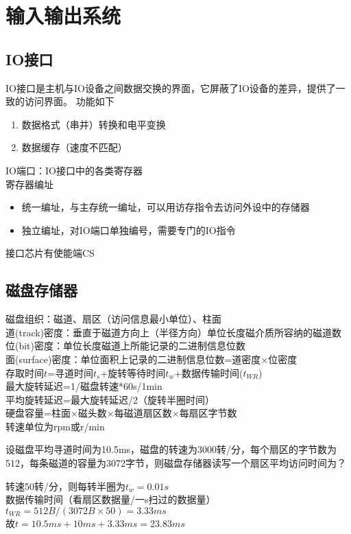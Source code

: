 
\section{输入输出系统}
\subsection{IO接口}
IO接口是主机与IO设备之间数据交换的界面，它屏蔽了IO设备的差异，提供了一致的访问界面。
功能如下
\begin{enumerate}
	\item 数据格式（串并）转换和电平变换
	\item 数据缓存（速度不匹配）
\end{enumerate}
IO端口：IO接口中的各类寄存器\\
寄存器编址
\begin{itemize}
	\item 统一编址，与主存统一编址，可以用访存指令去访问外设中的存储器
	\item 独立编址，对IO端口单独编号，需要专门的IO指令
\end{itemize}
接口芯片有使能端CS

\subsection{磁盘存储器}
磁盘组织：磁道、扇区（访问信息最小单位）、柱面\\
道(track)密度：垂直于磁道方向上（半径方向）单位长度磁介质所容纳的磁道数\\
位(bit)密度：单位长度磁道上所能记录的二进制信息位数\\
面(surface)密度：单位面积上记录的二进制信息位数=道密度$\times$位密度\\
存取时间$t$=寻道时间$t_s$+旋转等待时间$t_w$+数据传输时间($t_{WR}$)\\
最大旋转延迟=1/磁盘转速*60s/1min\\
平均旋转延迟=最大旋转延迟/2（旋转半圈时间）\\
硬盘容量=柱面$\times$磁头数$\times$每磁道扇区数$\times$每扇区字节数\\
转速单位为rpm或r/min
\begin{example}
设磁盘平均寻道时间为10.5ms，磁盘的转速为3000转/分，每个扇区的字节数为512，每条磁道的容量为3072字节，则磁盘存储器读写一个扇区平均访问时间为？
\end{example}
\begin{analysis}
转速50转/分，则每转半圈为$t_w=0.01s$\\
数据传输时间（看扇区数据量/一s扫过的数据量）$t_{WR}=512B/(3072B\times 50)=3.33ms$\\
故$t=10.5ms+10ms+3.33ms=23.83ms$
\end{analysis}

